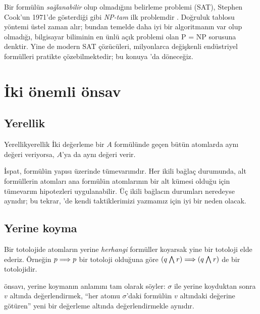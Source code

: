 \begin{arastirmanotu}[Araştırma Notu: SAT ve P = NP]
Bir formülün \emph{sağlanabilir} olup olmadığını belirleme problemi
(SAT), Stephen Cook'un 1971'de gösterdiği gibi \emph{NP-tam} ilk problemdir
\citep{cook1971}. Doğruluk tablosu yöntemi üstel zaman alır; bundan
temelde daha iyi bir algoritmanın var olup olmadığı, bilgisayar biliminin
en ünlü açık problemi olan P = NP sorusuna denktir. Yine de modern
SAT çözücüleri, milyonlarca değişkenli endüstriyel formülleri
pratikte çözebilmektedir; bu konuya 'da döneceğiz.
\end{arastirmanotu}

\section{İki önemli önsav}\label{sec:yerellik}

\subsection{Yerellik}

\begin{teorem}{Yerellik}{yerellik}
İki değerleme bir $A$ formülünde geçen bütün atomlarda aynı değeri
veriyorsa, $A$'ya da aynı değeri verir.
\end{teorem}


\noindent İspat, formülün yapısı üzerinde tümevarımdır. Her ikili bağlaç
durumunda, alt formüllerin atomları ana formülün atomlarının bir
alt kümesi olduğu için tümevarım hipotezleri uygulanabilir. Üç ikili
bağlacın durumları neredeyse aynıdır; bu tekrar, 'de
kendi taktiklerimizi yazmamız için iyi bir neden olacak.

\subsection{Yerine koyma}

Bir totolojide atomların yerine \emph{herhangi} formüller koyarsak yine
bir totoloji elde ederiz. Örneğin $p \Longrightarrow p$ bir totoloji olduğuna göre
$(q \mathbin{\textstyle\bigwedge} r) \Longrightarrow (q \mathbin{\textstyle\bigwedge} r)$ de bir totolojidir.


\noindent {} önsavı, yerine koymanın anlamını tam
olarak söyler: $\sigma$ ile yerine koyduktan sonra $v$ altında
değerlendirmek, ``her atomu $\sigma$'daki formülün $v$ altındaki
değerine götüren'' yeni bir değerleme altında değerlendirmekle aynıdır.

